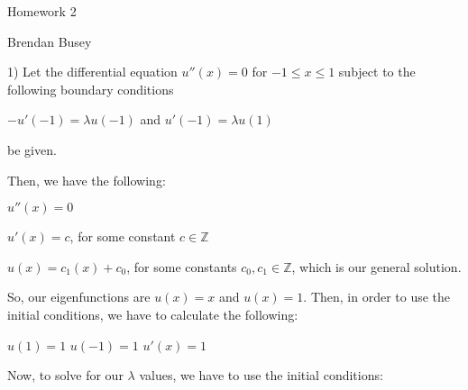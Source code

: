 \documentclass[executivepaper]{article}
\begin{document}
\vspace*{-40mm}

\begin{center}

Homework 2

\end{center}

\begin{flushright}

Brendan Busey

\end{flushright}

\begin{flushleft}

1) Let the differential equation $u''(x)=0$ for $-1 \leq x \leq 1$ subject to the following boundary conditions 

\begin{center}

$-u'(-1)=\lambda u(-1)$ and $u'(-1)=\lambda u(1)$

\end{center}

be given.

\vspace{3mm}

Then, we have the following: 

\begin{center}

$u''(x)=0$

\vspace{3mm}

$u'(x)=c$, for some constant $c \in \mathbb{Z}$

\vspace{3mm}

$u(x)=c_{1}(x)+c_{0}$, for some constants $c_{0}, c_{1} \in \mathbb{Z}$, which is our general solution.

\end{center}

So, our eigenfunctions are $u(x)=x$ and $u(x)=1$. Then, in order to use the initial conditions, we have to calculate the following:

\begin{center}

$u(1)=1$ \quad \quad $u(-1)=1$ \quad \quad $u'(x)=1$

\end{center}

Now, to solve for our $\lambda$ values, we have to use the initial conditions:

\vspace{3mm}


\end{flushleft}
\end{document}
